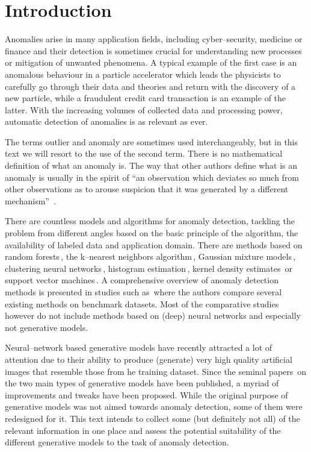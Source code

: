 \chapter{Introduction}

Anomalies arise in many application fields, including cyber--security,
medicine or finance and their detection is sometimes crucial for understanding
new processes or mitigation of unwanted phenomena. A typical example
of the first case is an anomalous behaviour in a particle accelerator
which leads the physicists to carefully go through their data and
theories and return with the discovery of a new particle, while a
fraudulent credit card transaction is an example of the latter. With
the increasing volumes of collected data and processing power, automatic
detection of anomalies is as relevant as ever.

The terms outlier and anomaly are sometimes used interchangeably,
but in this text we will resort to the use of the second term. There
is no mathematical definition of what an anomaly is. The way that
other authors define what is an anomaly is usually in the spirit of
``an observation which deviates so much from other observations as
to arouse suspicion that it was generated by a different mechanism''~\cite{barnett1974outliers}.

There are countless models and algorithms for anomaly detection, tackling
the problem from different angles based on the basic principle of
the algorithm, the availability of labeled data and application domain.
There are methods based on random forests\,\cite{liu2008isolation},
the k--nearest neighbors algorithm\,\cite{harmeling2006outliers},
Gaussian mixture models\,\cite{mahadevan2010anomaly}, clustering
neural networks\,\cite{schlegl2017unsupervised}, histogram estimation\,\cite{pevny2016loda},
kernel density estimates\,\cite{latecki2007outlier} or support vector
machines\,\cite{scholkopf2001estimating}. A comprehensive overview
of anomaly detection methods is presented in studies such as\,\cite{pimentel2014review,goldstein2016comparative,lazarevic2003comparative,chandola2009anomaly,campos2016evaluation}
where the authors compare several existing methods on benchmark datasets.
Most of the comparative studies however do not include methods based
on (deep) neural networks and especially not generative models.

Neural--network based generative models have recently attracted a
lot of attention due to their ability to produce (generate) very high
quality artificial images that resemble those from he training dataset.
Since the seminal papers\,\cite{goodfellow2014gan,kingma2013vae}
on the two main types of generative models have been published, a
myriad of improvements and tweaks have been proposed. While the original
purpose of generative models was not aimed towards anomaly detection,
some of them were redesigned for it. This text intends to collect
some (but definitely not all) of the relevant information in one place
and assess the potential suitability of the different generative models
to the task of anomaly detection.

